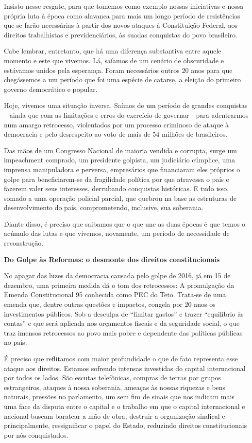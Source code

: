 Insisto nesse resgate, para que tomemos como exemplo nossas iniciativas
e nossa própria luta à época como alavanca para mais um longo período de
resistências que se farão necessárias à partir dos novos ataques à
Constituição Federal, aos direitos trabalhistas e previdenciários, às
suadas conquistas do povo brasileiro.

Cabe lembrar, entretanto, que há uma diferença substantiva entre aquele
momento e este que vivemos. Lá, saíamos de um cenário de obscuridade e
estávamos unidos pela esperança. Foram necessários outros 20 anos para
que chegássemos a um período que foi uma espécie de catarse, a eleição
do primeiro governo democrático e popular.

Hoje, vivemos uma situação inversa. Saímos de um período de grandes
conquistas -- ainda que com as limitações e erros do exercício de
governar - para adentrarmos num amargo retrocesso, violentados por um
processo criminoso de ataque à democracia e pelo desrespeito ao voto de
mais de 54 milhões de brasileiros.

Das mãos de um Congresso Nacional de maioria vendida e corrupta, surge
um impeachment comprado, um presidente golpista, um judiciário cúmplice,
uma imprensa manipuladora e perversa, empresários que financiaram eles
próprios o golpe para beneficiarem-se da fragilidade política por que
atravessa o país e fazerem valer seus interesses, derrubando conquistas
históricas. E tudo isso, somado a uma operação policial parcial, que
quebrou na base as estruturas de desenvolvimento do país, comprometendo,
inclusive, sua soberania.

Diante disso, é preciso que saibamos que o que une as duas épocas é que
temos o acúmulo das lutas e que vivemos, novamente, um período de
necessidade de reconstrução.

\textbf{Do Golpe às Reformas: o desmonte dos direitos constitucionais}

No apagar das luzes da democracia causada pelo golpe de 2016, já em 15
de dezembro, uma primeira medida dá o tom dos retrocessos: A promulgação
da Emenda Constitucional 95 conhecida como PEC do Teto. Trata-se de uma
emenda que, dentre outras questões e impactos, congela por 20 anos os
investimentos públicos. Sob a desculpa de ``limitar gastos'' e trazer
``equilíbrio às contas'' e que será aplicada nos orçamentos fiscais e da
seguridade social, o que traz imensos retrocessos ao povo mais pobre e
dependente das políticas públicas no país.

É preciso que reflitamos com maior profundidade o que de fato representa
esse ataque aos direitos. Estamos sofrendo intensas investidas do
capital internacional por todos os lados. São escutas telefônicas,
compras de terras por grupos estrangeiros, ataques à nossa soberania,
ameaças às nossas riquezas e bens naturais, pressões no parlamento, um
sem fim de sinais que nos indicam mais uma face da disputa entre o
capital e o trabalho em que o capital internacional e nacional buscam
baratear a mão de obra, destruir a organização sindical e
principalmente, ressignificar o papel do Estado, reduzindo direitos
constitucionais por nós conquistados.

